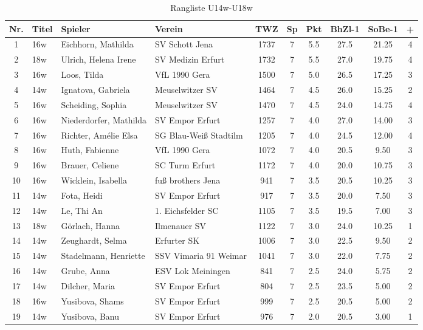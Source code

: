 \begin{table}[H]
\centering
\begin{tabular}{|c|l|l|l|c|c|c|c|c|c|}
\hline
Nr. & Titel & Spieler & Verein & TWZ & Sp & Pkt & BhZl-1 & SoBe-1 & + \\ \hline
1 & 16w & Eichhorn, Mathilda & SV Schott Jena & 1737 & 7 & 5.5 & 27.5 & 21.25 & 4 \\
2 & 18w & Ulrich, Helena Irene & SV Medizin Erfurt & 1732 & 7 & 5.5 & 27.0 & 19.75 & 4 \\
3 & 16w & Loos, Tilda & VfL 1990 Gera & 1500 & 7 & 5.0 & 26.5 & 17.25 & 3 \\
4 & 14w & Ignatova, Gabriela & Meuselwitzer SV & 1464 & 7 & 4.5 & 26.0 & 15.25 & 2 \\
5 & 16w & Scheiding, Sophia & Meuselwitzer SV & 1470 & 7 & 4.5 & 24.0 & 14.75 & 4 \\
6 & 16w & Niederdorfer, Mathilda & SV Empor Erfurt & 1257 & 7 & 4.0 & 27.0 & 14.00 & 3 \\
7 & 16w & Richter, Amélie Elsa & SG Blau-Weiß Stadtilm & 1205 & 7 & 4.0 & 24.5 & 12.00 & 4 \\
8 & 16w & Huth, Fabienne & VfL 1990 Gera & 1072 & 7 & 4.0 & 20.5 & 9.50 & 3 \\
9 & 16w & Brauer, Celiene & SC Turm Erfurt & 1172 & 7 & 4.0 & 20.0 & 10.75 & 3 \\
10 & 16w & Wicklein, Isabella & fuß brothers Jena & 941 & 7 & 3.5 & 20.5 & 10.25 & 3 \\
11 & 14w & Fota, Heidi & SV Empor Erfurt & 917 & 7 & 3.5 & 20.0 & 7.50 & 3 \\
12 & 14w & Le, Thi An & 1. Eichsfelder SC & 1105 & 7 & 3.5 & 19.5 & 7.00 & 3 \\
13 & 18w & Görlach, Hanna & Ilmenauer SV & 1122 & 7 & 3.0 & 24.0 & 10.25 & 1 \\
14 & 14w & Zeughardt, Selma & Erfurter SK & 1006 & 7 & 3.0 & 22.5 & 9.50 & 2 \\
15 & 14w & Stadelmann, Henriette & SSV Vimaria 91 Weimar & 1041 & 7 & 3.0 & 22.0 & 7.75 & 2 \\
16 & 14w & Grube, Anna & ESV Lok Meiningen & 841 & 7 & 2.5 & 24.0 & 5.75 & 2 \\
17 & 14w & Dilcher, Maria & SV Empor Erfurt & 804 & 7 & 2.5 & 23.5 & 5.00 & 2 \\
18 & 16w & Yusibova, Shams & SV Empor Erfurt & 999 & 7 & 2.5 & 20.5 & 5.00 & 2 \\
19 & 14w & Yusibova, Banu & SV Empor Erfurt & 976 & 7 & 2.0 & 20.5 & 3.00 & 1 \\ \hline
\end{tabular}
\caption{Rangliste U14w-U18w}
\label{tab:Rangliste_U14w-U18w}
\end{table}
